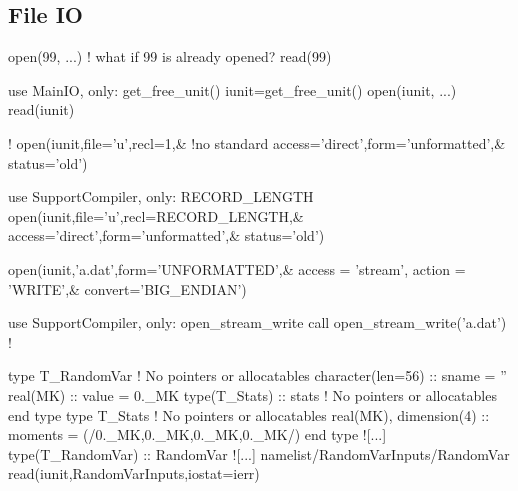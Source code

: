 \documentclass{article}
\begin{document}
\subsection{File IO}
\label{sec:fileio}
\begin{codea}


open(99, ...) ! what if 99 is already opened?
read(99)
\end{codea} 
\begin{codeb}
use MainIO, only: get_free_unit()
iunit=get_free_unit()
open(iunit, ...)
read(iunit)
\end{codeb}
\begin{codea}
!
open(iunit,file='u',recl=1,& !no standard 
    access='direct',form='unformatted',&
    status='old')
\end{codea} 
\begin{codeb}
use SupportCompiler, only: RECORD_LENGTH
open(iunit,file='u',recl=RECORD_LENGTH,& 
    access='direct',form='unformatted',&
    status='old')
\end{codeb}
\begin{codea}
open(iunit,'a.dat',form='UNFORMATTED',&
     access = 'stream', action = 'WRITE',&
     convert='BIG_ENDIAN') 
\end{codea} 
\begin{codeb}
use SupportCompiler, only: open_stream_write
call open_stream_write('a.dat') 
!
\end{codeb}
\begin{codefull}
    type T_RandomVar ! No pointers or allocatables
        character(len=56)   :: sname = ''
        real(MK)            :: value = 0._MK
        type(T_Stats)       :: stats ! No pointers or allocatables
    end type
    type T_Stats ! No pointers or allocatables
        real(MK), dimension(4)  :: moments = (/0._MK,0._MK,0._MK,0._MK/)
    end type
    ![...]
    type(T_RandomVar) :: RandomVar
    ![...]
    namelist/RandomVarInputs/RandomVar
    read(iunit,RandomVarInputs,iostat=ierr)
\end{codefull} 
\end{document}
